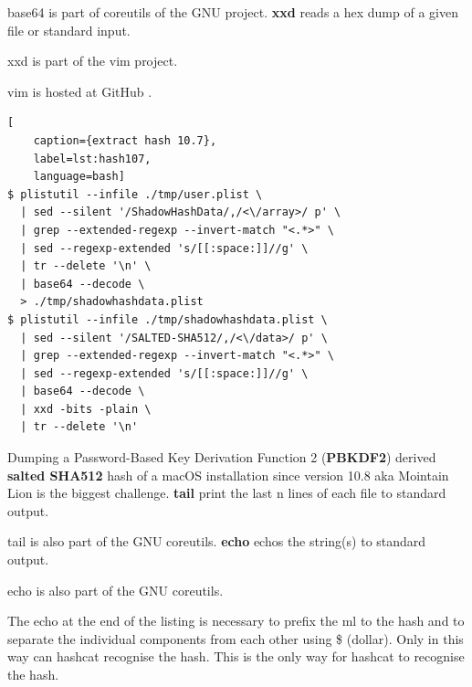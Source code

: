 base64 is part of coreutils of the GNU project.\newline
\newline
\noindent \textbf{xxd} reads a hex dump of a given file or standard input.

xxd is part of the vim project.

vim is hosted at GitHub \cite{Xxd}.

\begin{lstlisting}[
    caption={extract hash 10.7},
    label=lst:hash107,
    language=bash]
$ plistutil --infile ./tmp/user.plist \
  | sed --silent '/ShadowHashData/,/<\/array>/ p' \
  | grep --extended-regexp --invert-match "<.*>" \
  | sed --regexp-extended 's/[[:space:]]//g' \
  | tr --delete '\n' \
  | base64 --decode \
  > ./tmp/shadowhashdata.plist
$ plistutil --infile ./tmp/shadowhashdata.plist \
  | sed --silent '/SALTED-SHA512/,/<\/data>/ p' \
  | grep --extended-regexp --invert-match "<.*>" \
  | sed --regexp-extended 's/[[:space:]]//g' \
  | base64 --decode \
  | xxd -bits -plain \
  | tr --delete '\n'
\end{lstlisting}

\noindent Dumping a Password-Based Key Derivation Function 2 (\textbf{PBKDF2}) derived \textbf{salted SHA512} hash of a macOS installation since version 10.8 aka Mointain Lion is the biggest challenge.\newline
\newline
\noindent \textbf{tail} print the last n lines of each file to standard output.

tail is also part of the GNU coreutils.\newline
\newline
\noindent \textbf{echo} echos the string(s) to standard output.

echo is also part of the GNU coreutils.

The echo at the end of the listing is necessary to prefix the \glqq{}ml\grqq{} to the hash and to separate the individual components from each other using \$ (dollar). Only in this way can hashcat recognise the hash. This is the only way for hashcat to recognise the hash.

